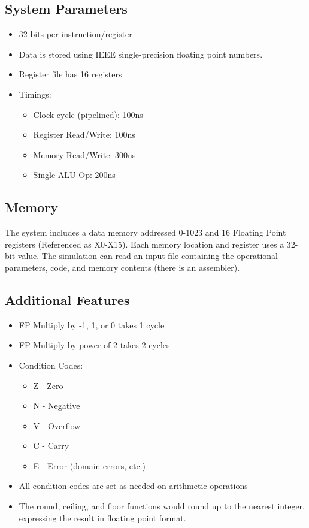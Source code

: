 \documentclass[letter,14pt]{article}
\begin{document}
\subsection{System Parameters}
\begin{itemize}
    \setlength{\parskip}{0pt}
    \setlength{\itemsep}{0pt plus 1pt}
    \item 32 bits per instruction/register
    \item Data is stored using IEEE single-precision floating point numbers.
    \item Register file has 16 registers
    \item Timings:
    \begin{itemize}
        \setlength{\parskip}{0pt}
        \item Clock cycle (pipelined): 100ns
        \item Register Read/Write: 100ns
        \item Memory Read/Write: 300ns
        \item Single ALU Op: 200ns
    \end{itemize}
\end{itemize}

\subsection{Memory}
The system includes a data memory addressed 0-1023 and 16 Floating Point registers (Referenced as X0-X15). Each memory location and register uses a 32-bit value. The simulation can read an input file containing the operational parameters, code, and memory contents (there is an assembler).
\subsection{Additional Features}
\begin{itemize}
    \setlength{\parskip}{0pt}
    \setlength{\itemsep}{0pt plus 1pt}
    \item FP Multiply by -1, 1, or 0 takes 1 cycle
    \item FP Multiply by power of 2 takes 2 cycles
    \item Condition Codes:
    \begin{itemize}
        \setlength{\parskip}{0pt}
        \setlength{\itemsep}{0pt plus 1pt}
        \item Z - Zero
        \item N - Negative
        \item V - Overflow
        \item C - Carry
        \item E - Error (domain errors, etc.)
    \end{itemize}
    \item All condition codes are set as needed on arithmetic operations
    \item The round, ceiling, and floor functions would round up to the nearest integer, expressing the result in floating point format.
\end{itemize}
\end{document}
